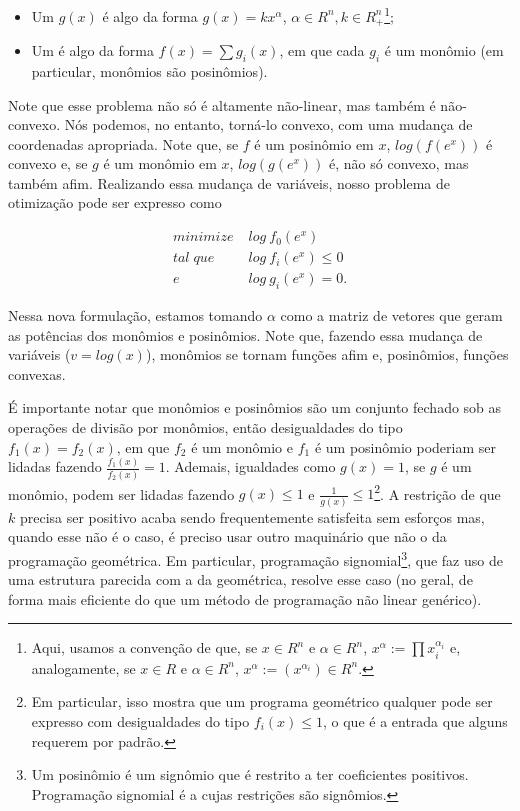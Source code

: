 \documentclass{article}
\begin{document}
\begin{itemize}
\item Um  $g(x)$ é algo da forma $g(x) =
  kx^{\alpha}$, $\alpha \in R^n, k \in R^n_{+}$\footnote{Aqui, usamos
    a convenção de que, se $x \in R^n$ e $\alpha \in R^n$, $x^{\alpha}
    := \prod x_i^{\alpha_i}$ e, analogamente, se $x \in R$ e $\alpha \in R^n$, $x^\alpha :=
    (x^{\alpha_i}) \in R^n$.};
\item Um  é algo da forma $f(x) = \sum g_i(x)$,
  em que cada $g_i$ é um monômio (em particular, monômios são
  posinômios).
\end{itemize}

Note que esse problema não só é altamente não-linear, mas também é
não-convexo. Nós podemos, no entanto, torná-lo convexo, com uma
mudança de coordenadas apropriada. Note que, se $f$ é um posinômio em
$x$, $log(f(e^x))$ é convexo e, se $g$ é um monômio em $x$,
$log(g(e^x))$ é, não só convexo, mas também afim. Realizando essa
mudança de variáveis, nosso problema de otimização pode ser expresso
como


\begin{align*}
  minimize\; & log\ f_0 (e^x)\\
  tal\; que\; & log\ f_i (e^x) \leq 0\\
  e\; & log\ g_i (e^x) = 0.
\end{align*}

Nessa nova formulação, estamos tomando $\alpha$ como a matriz de
vetores que geram as potências dos monômios e posinômios. Note que,
fazendo essa mudança de variáveis ($v = log(x)$), monômios se tornam
funções afim e, posinômios, funções convexas.

É importante notar que monômios e posinômios são um conjunto fechado
sob as operações de divisão por monômios, então desigualdades do tipo
$f_1(x) = f_2(x)$, em que $f_2$ é um monômio e $f_1$ é um posinômio
poderiam ser lidadas fazendo $\frac{f_1(x)}{f_2(x)} = 1$. Ademais,
igualdades como $g(x) = 1$, se $g$ é um monômio, podem ser lidadas
fazendo $g(x) \leq 1$ e $\frac{1}{g(x)} \leq 1$\footnote{Em
  particular, isso mostra que um programa geométrico qualquer pode ser
  expresso com desigualdades do tipo $f_i(x) \leq 1$, o que é a
  entrada que alguns  requerem por padrão.}. A
restrição de que $k$ precisa ser positivo acaba sendo frequentemente
satisfeita sem esforços mas, quando esse não é o caso, é preciso
usar outro maquinário que não o da programação geométrica. Em
particular, programação signomial\footnote{Um posinômio é um signômio
  que é restrito a ter coeficientes positivos. Programação signomial é
  a cujas restrições são signômios.}, que faz uso de uma estrutura
parecida com a da geométrica, resolve esse caso (no geral, de forma
mais eficiente do que um método de programação não linear
genérico).
\end{document}
